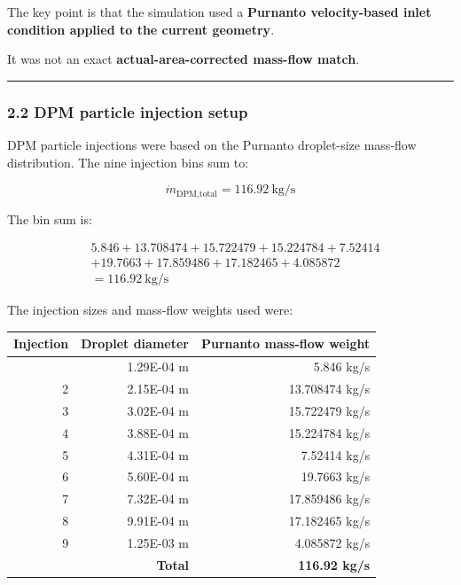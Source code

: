 \documentclass[
  11pt,
]{article}
\newcounter{none} %
\begin{document}
The key point is that the simulation used a \textbf{Purnanto
velocity-based inlet condition applied to the current geometry}.

It was not an exact \textbf{actual-area-corrected mass-flow match}.

\begin{center}\rule{0.5\linewidth}{0.5pt}\end{center}

\subsubsection{2.2 DPM particle injection
setup}\label{dpm-particle-injection-setup}

DPM particle injections were based on the Purnanto droplet-size
mass-flow distribution. The nine injection bins sum to:

\[
\dot{m}_{\text{DPM,total}}
=
116.92\ \text{kg/s}
\]

The bin sum is:

\[
\begin{aligned}
&5.846 + 13.708474 + 15.722479 + 15.224784 + 7.52414 \\
&+ 19.7663 + 17.859486 + 17.182465 + 4.085872 \\
&= 116.92\ \text{kg/s}
\end{aligned}
\]

The injection sizes and mass-flow weights used were:

{\def\LTcaptype{none} %
\begin{longtable}[]{@{}rrr@{}}
\toprule\noalign{}
Injection & Droplet diameter & Purnanto mass-flow weight \\
\midrule\noalign{}
\endhead
\bottomrule\noalign{}
\endlastfoot
1 & 1.29E-04 m & 5.846 kg/s \\
2 & 2.15E-04 m & 13.708474 kg/s \\
3 & 3.02E-04 m & 15.722479 kg/s \\
4 & 3.88E-04 m & 15.224784 kg/s \\
5 & 4.31E-04 m & 7.52414 kg/s \\
6 & 5.60E-04 m & 19.7663 kg/s \\
7 & 7.32E-04 m & 17.859486 kg/s \\
8 & 9.91E-04 m & 17.182465 kg/s \\
9 & 1.25E-03 m & 4.085872 kg/s \\
& \textbf{Total} & \textbf{116.92 kg/s} \\
\end{longtable}
}
\end{document}

